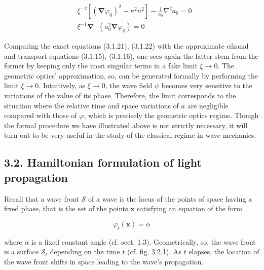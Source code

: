 \documentclass{article}
\begin{document}
 
\begin{align*}
& \xi^{-2}\left[\left(\boldsymbol{\nabla} \varphi_{0}\right)^{2}-\kappa^{2} n^{2}\right]-\frac{1}{a_{0}} \nabla^{2} a_{0}=0  \tag{3.1.21}\\
& \xi^{-1} \boldsymbol{\nabla} \cdot\left(a_{0}^{2} \boldsymbol{\nabla} \varphi_{0}\right)=0 \tag{3.1.22}
\end{align*}
 

Comparing the exact equations (3.1.21), (3.1.22) with the approximate eikonal and transport equations (3.1.15), (3.1.16), one sees again the latter stem from the former by keeping only the most singular terms in a fake limit $\xi \rightarrow 0$. The geometric optics' approximation, so, can be generated formally by performing the limit $\xi \rightarrow 0$. Intuitively, as $\xi \rightarrow 0$, the wave field $\psi$ becomes very sensitive to the variations of the value of its phase. Therefore, the limit corresponds to the situation where the relative time and space variations of $a$ are negligible compared with those of $\varphi$, which is precisely the geometric optics regime. Though the formal procedure we have illustrated above is not strictly necessary, it will turn out to be very useful in the study of the classical regime in wave mechanics.

\subsection*{3.2. Hamiltonian formulation of light propagation}

Recall that a wave front $\mathcal{S}$ of a wave is the locus of the points of space having a fixed phase, that is the set of the points $\boldsymbol{x}$ satisfying an equation of the form
 
\begin{equation*}
\varphi_{t}(\boldsymbol{x})=\alpha \tag{3.2.1}
\end{equation*}
 
where $\alpha$ is a fixed constant angle (cf. sect. 1.3). Geometrically, so, the wave front is a surface $\mathcal{S}_{t}$ depending on the time $t$ (cf. fig. 3.2.1). As $t$ elapses, the location of the wave front shifts in space leading to the wave's propagation.
\end{document}
